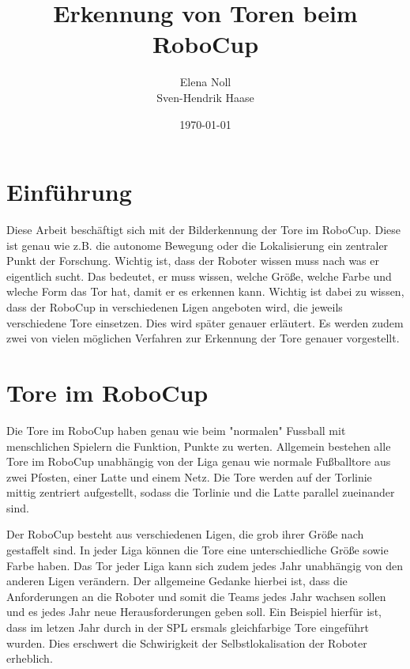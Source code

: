 \documentclass[a4paper,12pt]{article}
\begin{document}
\renewcommand\bibname{Referenzen}
\renewcommand\refname{Referenzen}

\begin{titlepage}
\author{Elena Noll\\
		Sven-Hendrik Haase}
\title{Erkennung von Toren beim RoboCup} 
\date{\today} 
\maketitle
\thispagestyle{empty}
\end{titlepage}

\tableofcontents

\newpage

\section{Einführung}
Diese Arbeit beschäftigt sich mit der Bilderkennung der Tore im RoboCup.
Diese ist genau wie z.B. die autonome Bewegung oder die Lokalisierung ein zentraler Punkt der Forschung.
Wichtig ist, dass der Roboter wissen muss nach was er eigentlich sucht. Das bedeutet, er muss wissen, welche Größe, welche Farbe und wleche Form das Tor hat, damit er es erkennen kann.
Wichtig ist dabei zu wissen, dass der RoboCup in verschiedenen Ligen
angeboten wird, die jeweils verschiedene Tore einsetzen. Dies wird später
genauer erläutert. Es werden zudem zwei von vielen möglichen Verfahren zur Erkennung
der Tore genauer vorgestellt.

\section{Tore im RoboCup}
Die Tore im RoboCup haben genau wie beim "normalen" Fussball mit menschlichen
Spielern die Funktion, Punkte zu werten.
Allgemein bestehen alle Tore im RoboCup unabhängig von der Liga genau wie normale Fußballtore aus zwei Pfosten, einer Latte und einem Netz. Die Tore werden auf der Torlinie mittig zentriert aufgestellt, sodass die Torlinie und die Latte parallel zueinander sind.

Der RoboCup besteht aus verschiedenen Ligen, die grob ihrer Größe nach
gestaffelt sind. In jeder Liga können die Tore eine unterschiedliche Größe sowie Farbe haben. Das Tor jeder Liga kann sich zudem jedes Jahr unabhängig von den
anderen Ligen verändern. Der allgemeine Gedanke hierbei ist, dass die
Anforderungen an die Roboter und somit die Teams jedes Jahr wachsen sollen und es jedes Jahr neue Herausforderungen geben soll. Ein Beispiel hierfür ist, dass im letzen Jahr durch in der SPL ersmals gleichfarbige Tore eingeführt wurden.
Dies erschwert die Schwirigkeit der Selbstlokalisation der Roboter erheblich.
\end{document}

